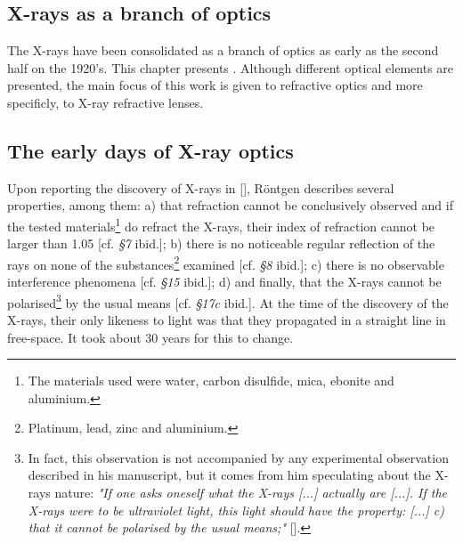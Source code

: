 \begin{refsection}
\chapter{X-rays as a branch of optics}\label{sec:x-ray_optics}

The X-rays have been consolidated as a branch of optics as early as the second half on the 1920's. This chapter presents . Although different optical elements are presented, the main focus of this work is given to refractive optics and more specificly, to X-ray refractive lenses. 

\section{The early days of X-ray optics}\label{sec:early_days}

Upon reporting the discovery of  X-rays in [\cite{Roentgen1896_ch3}], R\"{o}ntgen describes several properties, among them: a) that refraction cannot be conclusively observed and if the tested materials\footnote{The materials used were water, carbon disulfide, mica, ebonite and aluminium.} do refract the X-rays, their index of refraction cannot be larger than 1.05 [cf. \textit{§7} ibid.]; b) there is no noticeable regular reflection of the rays on none of the substances\footnote{Platinum, lead, zinc and aluminium.} examined [cf. \textit{§8} ibid.]; c) there is no observable interference phenomena [cf. \textit{§15} ibid.]; d) and finally, that the X-rays cannot be polarised\footnote{In fact, this observation is not accompanied by any experimental observation described in his manuscript, but it comes from him speculating about the X-rays nature: \textit{"If one asks oneself what the X-rays [...] actually are [...]. If the X-rays were to be ultraviolet light, this light should have the property: [...] c)
that it cannot be polarised by the usual means;"} [\cite[\textit{§17}]{Roentgen1896_ch3}].} by the usual means [cf. \textit{§17c} ibid.]. At the time of the discovery of the X-rays, their only likeness to light was that they propagated in a straight line in free-space. It took about 30 years for this to change.


\end{refsection}
